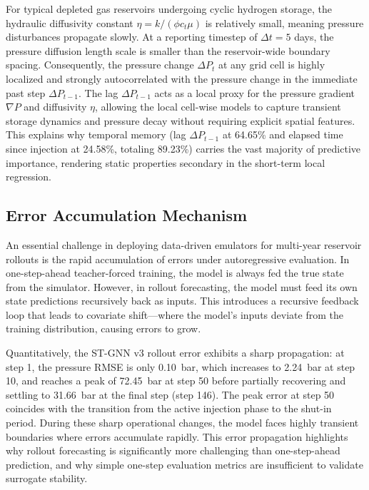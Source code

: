 \documentclass[10pt,twocolumn]{article}
\begin{document}
For typical depleted gas reservoirs undergoing cyclic hydrogen storage, the hydraulic diffusivity constant $\eta = k / (\phi c_t \mu)$ is relatively small, meaning pressure disturbances propagate slowly. At a reporting timestep of $\Delta t = 5$ days, the pressure diffusion length scale is smaller than the reservoir-wide boundary spacing. Consequently, the pressure change $\Delta P_t$ at any grid cell is highly localized and strongly autocorrelated with the pressure change in the immediate past step $\Delta P_{t-1}$. The lag $\Delta P_{t-1}$ acts as a local proxy for the pressure gradient $\nabla P$ and diffusivity $\eta$, allowing the local cell-wise models to capture transient storage dynamics and pressure decay without requiring explicit spatial features. This explains why temporal memory (lag $\Delta P_{t-1}$ at 64.65\% and elapsed time since injection at 24.58\%, totaling 89.23\%) carries the vast majority of predictive importance, rendering static properties secondary in the short-term local regression.

\subsection{Error Accumulation Mechanism}
An essential challenge in deploying data-driven emulators for multi-year reservoir rollouts is the rapid accumulation of errors under autoregressive evaluation. In one-step-ahead teacher-forced training, the model is always fed the true state from the simulator. However, in rollout forecasting, the model must feed its own state predictions recursively back as inputs. This introduces a recursive feedback loop that leads to covariate shift—where the model's inputs deviate from the training distribution, causing errors to grow.

Quantitatively, the ST-GNN v3 rollout error exhibits a sharp propagation: at step 1, the pressure RMSE is only 0.10~bar, which increases to 2.24~bar at step 10, and reaches a peak of 72.45~bar at step 50 before partially recovering and settling to 31.66~bar at the final step (step 146). The peak error at step 50 coincides with the transition from the active injection phase to the shut-in period. During these sharp operational changes, the model faces highly transient boundaries where errors accumulate rapidly. This error propagation highlights why rollout forecasting is significantly more challenging than one-step-ahead prediction, and why simple one-step evaluation metrics are insufficient to validate surrogate stability.
\end{document}
